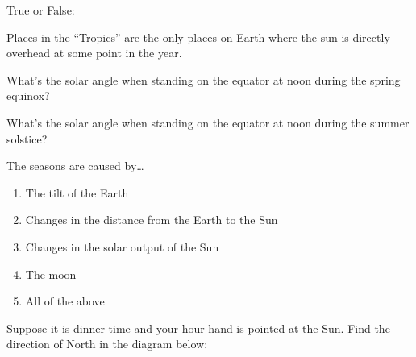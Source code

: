 \documentclass[noauthor,nooutcomes]{ximera}
\author{Bart Snapp}
\begin{document}
\maketitle


\begin{exercise}
  True or False:

Places in the ``Tropics'' are the only places on Earth where the sun is directly overhead at some point in the year.
\end{exercise}


\begin{exercise}
  What's the solar angle when standing on the equator at noon during the spring equinox?
\end{exercise}


\begin{exercise}
  What's the solar angle when standing on the equator at noon during the summer solstice?
\end{exercise}



\begin{exercise}
  The seasons are caused by\dots
\begin{enumerate}
  \item The tilt of the Earth
  \item Changes in the distance from the Earth to the Sun
  \item Changes in the solar output of the Sun
  \item The moon
  \item All of the above
\end{enumerate}
\end{exercise}

\begin{exercise}
Suppose it is dinner time  and your hour
    hand is pointed at the Sun. Find 
    the direction of North in the diagram below:
    \begin{center}
    \end{center}
  \end{exercise}












\end{document}
